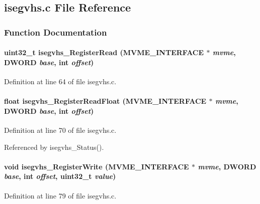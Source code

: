 \subsection{isegvhs.c File Reference}
\label{isegvhs_8c}


\subsubsection{Function Documentation}
\paragraph[{isegvhs\_\-RegisterRead}]{\setlength{\rightskip}{0pt plus 5cm}uint32\_\-t isegvhs\_\-RegisterRead ({\bf MVME\_\-INTERFACE} $\ast$ {\em mvme}, \/  {\bf DWORD} {\em base}, \/  int {\em offset})}\hfill\label{isegvhs_8c_ad44865249ca0620bf6adfe47188c63a0}


Definition at line 64 of file isegvhs.c.
\paragraph[{isegvhs\_\-RegisterReadFloat}]{\setlength{\rightskip}{0pt plus 5cm}float isegvhs\_\-RegisterReadFloat ({\bf MVME\_\-INTERFACE} $\ast$ {\em mvme}, \/  {\bf DWORD} {\em base}, \/  int {\em offset})}\hfill\label{isegvhs_8c_a8993cc4b365d63d6673c6dec9c889dc1}


Definition at line 70 of file isegvhs.c.

Referenced by isegvhs\_\-Status().
\paragraph[{isegvhs\_\-RegisterWrite}]{\setlength{\rightskip}{0pt plus 5cm}void isegvhs\_\-RegisterWrite ({\bf MVME\_\-INTERFACE} $\ast$ {\em mvme}, \/  {\bf DWORD} {\em base}, \/  int {\em offset}, \/  uint32\_\-t {\em value})}\hfill\label{isegvhs_8c_a37cc2259f03b5c7357a688afae618f24}


Definition at line 79 of file isegvhs.c.
